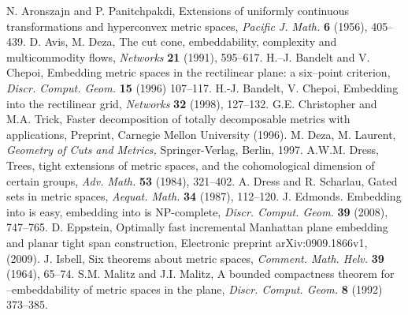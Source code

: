 \documentclass[11pt]{amsart}
\begin{document}
\begin{thebibliography}{99}
 N. Aronszajn and P. Panitchpakdi, Extensions of uniformly continuous transformations
and hyperconvex metric spaces, {\it Pacific J. Math.} {\bf 6} (1956), 405--439.
 D. Avis, M. Deza, The cut cone,  embeddability, complexity and multicommodity flows, {\it Networks} {\bf 21} (1991),
595--617.
 H.--J. Bandelt and V. Chepoi,  Embedding metric spaces in the rectilinear
plane: a six--point criterion, {\it Discr. Comput. Geom.} {\bf 15} (1996) 107--117.
 H.-J. Bandelt, V. Chepoi, Embedding into the rectilinear grid, {\it Networks}  {\bf 32} (1998), 127--132.
 G.E. Christopher and M.A. Trick, Faster decomposition of totally decomposable metrics with applications,
Preprint, Carnegie Mellon University (1996).
  M. Deza, M. Laurent, {\it Geometry of Cuts and
Metrics,}  Springer-Verlag, Berlin, 1997.
 A.W.M. Dress, Trees, tight extensions of metric spaces, and the cohomological
dimension of certain groups,  {\it Adv. Math.}  {\bf 53} (1984), 321--402.
  A. Dress and R. Scharlau, Gated sets in metric spaces,
    {\it Aequat. Math.} {\bf 34} (1987), 112--120.
 J. Edmonds. Embedding into  is easy, embedding into  is NP-complete, \emph{Discr. Comput. Geom.} {\bf 39} (2008), 747--765.
 D. Eppstein, Optimally fast incremental Manhattan plane embedding and planar tight span construction, Electronic preprint arXiv:0909.1866v1, (2009).
 J. Isbell, Six theorems about metric spaces, {\it Comment. Math.
Helv.} {\bf 39} (1964), 65--74.
 S.M. Malitz and J.I. Malitz,  A bounded compactness theorem for
--embeddability of metric spaces in the plane, {\it Discr. Comput. Geom.}
{\bf 8} (1992) 373--385.

\end{thebibliography}
\end{document}
